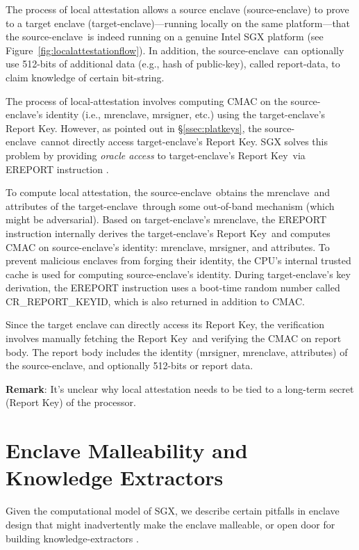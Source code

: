 \documentclass[letterpaper]{article}
\newcommand{\secref}[1]{\S\ref{#1}}
\newcommand{\mrenclave}{\textsf{mrenclave}}
\newcommand{\mrsigner}{\textsf{mrsigner}}
\newcommand{\se}{source-enclave}
\newcommand{\te}{target-enclave}
\newcommand{\rk}{\textsf{Report Key}}
\begin{document}
  The process of local attestation allows a source enclave (\se) to
  prove to a target enclave (\te)---running locally on the same
  platform---that the \se\ is indeed running on a genuine Intel SGX
  platform (see Figure~\ref{fig:localattestationflow}). In addition,
  the \se\ can optionally use 512-bits of additional data (e.g., hash
  of public-key), called report-data, to claim knowledge of certain
  bit-string.

  The process of local-attestation involves computing \textsf{CMAC}
  \cite{aescmac} on the \se's identity (i.e., \mrenclave, \mrsigner,
  etc.) using the \te's \rk. However, as pointed out in
  \secref{ssec:platkeys}, the \se\ cannot directly access \te's
  \rk. SGX solves this problem by providing \textit{oracle access} to
  \te's \rk\ via \textsf{EREPORT} instruction
  \cite[\S14.4.1]{intelsdm}.

  To compute local attestation, the \se\ obtains the \mrenclave\ and
  attributes of the \te\ through some out-of-band mechanism (which
  might be adversarial). Based on \te's \mrenclave, the
  \textsf{EREPORT} instruction internally derives the \te's \rk\ and
  computes \textsf{CMAC} on \se's identity: \mrenclave, \mrsigner, and
  attributes. To prevent malicious enclaves from forging their
  identity, the CPU's internal trusted cache is used for computing
  \se's identity. During \te's key derivation, the \textsf{EREPORT}
  instruction uses a boot-time random number called
  \textsf{CR\_REPORT\_KEYID}, which is also returned in addition to
  \textsf{CMAC}.

  Since the target enclave can directly access its \rk, the
  verification involves manually fetching the \rk\ and verifying the
  \textsf{CMAC} on report body. The report body includes the identity
  (\mrsigner, \mrenclave, attributes) of the \se, and optionally
  512-bits or report data.

  \textbf{Remark}: It's unclear why local attestation needs to be tied
  to a long-term secret (\rk) of the processor.

  \section{Enclave Malleability and Knowledge Extractors}
  \label{sec:analysisfwk}

  Given the computational model of SGX, we describe certain pitfalls
  in enclave design that might inadvertently  make  the  enclave
  malleable, or open door for building knowledge-extractors
  \cite{BellarePOK}.
\end{document}
